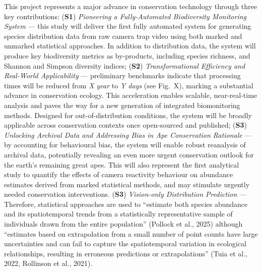 This project represents a major advance in conservation technology through three key contributions:
(\textbf{S1}) \textit{Pioneering a Fully-Automated Biodiversity Monitoring System} — this study will deliver the first fully automated system for generating species distribution data from raw camera trap video using both marked and unmarked statistical approaches. In addition to distribution data, the system will produce key biodiversity metrics as by-products, including species richness, and Shannon and Simpson diversity indices;
(\textbf{S2}) \textit{Transformational Efficiency and Real-World Applicability} — preliminary benchmarks indicate that processing times will be reduced from \textit{X year} to \textit{Y days} (see Fig.~X), marking a substantial advance in conservation ecology. This acceleration enables scalable, near-real-time analysis and paves the way for a new generation of integrated biomonitoring methods. Designed for out-of-distribution conditions, the system will be broadly applicable across conservation contexts once open-sourced and published;
(\textbf{S3}) \textit{Unlocking Archival Data and Addressing Bias in Ape Conservation Rationale} — by accounting for behavioural bias, the system will enable robust reanalysis of archival data, potentially revealing an even more urgent conservation outlook for the earth’s remaining great apes. This will also represent the first analytical study to quantify the effects of camera reactivity behaviour on abundance estimates derived from marked statistical methods, and may stimulate urgently needed conservation interventions.
(\textbf{S3}) \textit{Vision-only Distribution Prediction} — Therefore, statistical approaches are used to “estimate both species abundance and its spatiotemporal trends from a statistically representative sample of individuals drawn from the entire population” (Pollock et al., 2025) although “estimates based on extrapolation from a small number of point counts have large uncertainties and can fail to capture the spatiotemporal variation in ecological relationships, resulting in erroneous predictions or extrapolations” (Tuia et al., 2022, Rollinson et al., 2021). 

